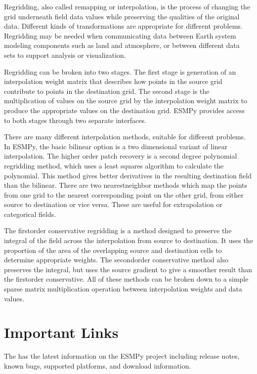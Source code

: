 \documentclass[letterpaper,10pt,english]{sphinxmanual}
\begin{document}
Regridding, also called remapping or interpolation, is the process of changing
the grid underneath field data values while preserving the qualities of the
original data. Different kinds of transformations are appropriate for
different problems. Regridding may be needed when communicating data between
Earth system modeling components such as land and atmosphere, or between
different data sets to support analysis or visualization.

Regridding can be broken into two stages. The first stage is generation of an
interpolation weight matrix that describes how points in the source grid
contribute to points in the destination grid. The second stage is the
multiplication of values on the source grid by the interpolation weight matrix
to produce the appropriate values on the destination grid. ESMPy provides
access to both stages through two separate interfaces.

There are many different interpolation methods, suitable for different problems.
In ESMPy, the basic bilinear option is a two dimensional variant of linear 
interpolation. The higher order patch recovery is a second degree polynomial 
regridding method, which uses a least squares algorithm to calculate the 
polynomial. This method gives better derivatives in the resulting destination 
field than the bilinear. There are two nearest\sphinxhyphen{}neighbor methods which map the 
points from one grid to the nearest corresponding point on the other grid, from
either source to destination or vice versa. These are useful for extrapolation 
or categorical fields.

The first\sphinxhyphen{}order conservative regridding is a method designed to preserve the 
integral of the field across the interpolation from source to destination.  It 
uses the proportion of the area of the overlapping source and destination cells
to determine appropriate weights. The second\sphinxhyphen{}order conservative method also 
preserves the integral, but uses the source gradient to give a smoother result 
than the first\sphinxhyphen{}order conservative. All of these methods can be broken down to a
simple sparse matrix multiplication operation between interpolation weights and
data values.


\chapter{Important Links}
\label{\detokenize{intro:important-links}}
The  has the
latest information on the ESMPy project including release notes, known
bugs, supported platforms, and download information.
\end{document}
